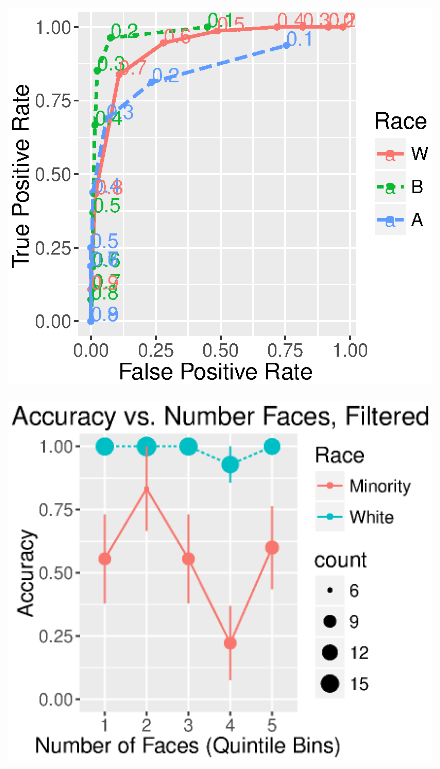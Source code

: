 \begin{figure}[h]
  \centering
  \begin{minipage}{.21\textwidth}
    \centering
    \includegraphics[width=\linewidth]{fig/census/roc_race.eps}
    \label{fig:roc_race}
  \end{minipage}
  \begin{minipage}{.21\textwidth}
    \centering
    \includegraphics[width=\linewidth]{fig/census/facebin_race_filtered.eps}
    \label{fig:facebin_race_filtered}
  \end{minipage}
  \caption{}
  \label{fig:more_race}
\end{figure}

